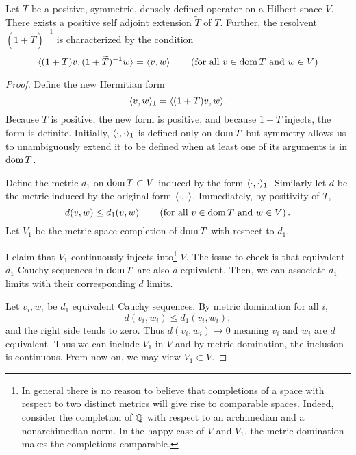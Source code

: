 \documentclass[11pt]{amsart}
\begin{document}
	
	\begin{thm}
		Let $T$ be a positive, symmetric, densely defined operator on a Hilbert space $V$. There exists a positive self adjoint extension $\tilde{T}$ of $T$. Further, the resolvent $(1+\tilde{T})^{-1}$ is characterized by the condition
		\begin{equation*}
			\langle (1+T)v, (1+\widetilde{T})^{-1}w \rangle=\langle v, w \rangle \qquad \left( \text{for all } v \in \operatorname{dom} T \text{ and } w \in V \right)  
		\end{equation*}
	\end{thm}
	\begin{proof}
		Define the new Hermitian form
			\begin{equation*}
				\langle v, w \rangle_1=\langle (1+T)v, w \rangle.
			\end{equation*}
		Because $T$ is positive, the new form is positive, and because $1+T$ injects, the form is definite. Initially, $\langle \cdot, \cdot \rangle_1$ is defined only on $\operatorname{dom} T$ but symmetry allows us to unambiguously extend it to be defined when at least one of its arguments is in $\operatorname{dom} T$. 
		
		Define the metric $d_1$ on $\operatorname{dom} T \subset V$ induced by the form $\langle \cdot, \cdot \rangle_1$.  Similarly let $d$ be the metric induced by the original form $\langle \cdot, \cdot \rangle$.  Immediately, by positivity of $T$,
			\begin{equation*}
				d(v,w)\leq d_1(v,w) \qquad \left(\text{for all } v \in \operatorname{dom} T \text{ and } w\in V\right).
			\end{equation*}
		Let $V_1$ be the metric space completion of $\operatorname{dom} T$ with respect to $d_1$. 
		
		I claim that $V_1$ continuously injects into\footnote{In general there is no reason to believe that completions of a space with respect to two distinct metrics will give rise to comparable spaces. Indeed, consider the completion of $\mathbb{Q}$ with respect to an archimedian and a nonarchimedian norm. In the happy case of $V$ and $V_1$, the metric domination makes the completions comparable.} $V$. The issue to check is that equivalent $d_1$ Cauchy sequences in $\operatorname{dom} T$ are also $d$ equivalent. Then, we can associate $d_1$ limits with their corresponding $d$ limits. 
		
		Let $v_i,w_i$ be $d_1$ equivalent Cauchy sequences. By metric domination for all $i$,
			\begin{equation*}
				d(v_i,w_i)\leq d_1(v_i,w_i),
			\end{equation*}
		and the right side tends to zero. Thus $d(v_i,w_i)\to 0$ meaning $v_i$ and $w_i$ are $d$ equivalent. Thus we can include $V_1$ in $V$ and by metric domination, the inclusion is continuous. From now on, we may view $V_1\subset V$. 
		

\end{proof}
\end{document}
